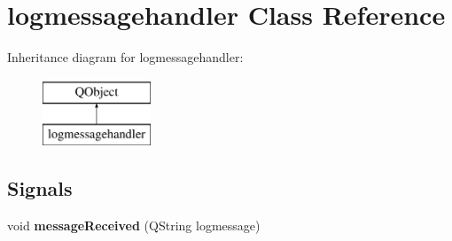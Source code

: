 \hypertarget{classlogmessagehandler}{}\section{logmessagehandler Class Reference}
\label{classlogmessagehandler}
Inheritance diagram for logmessagehandler\+:\begin{figure}[H]
\begin{center}
\leavevmode
\includegraphics[height=2.000000cm]{classlogmessagehandler}
\end{center}
\end{figure}
\subsection*{Signals}
\begin{DoxyCompactItemize}
\item 
\mbox{\label{classlogmessagehandler_ad9e6c61296a4ddfc7f5591981d00e02e}} 
void {\bfseries message\+Received} (Q\+String logmessage)
\end{DoxyCompactItemize}
